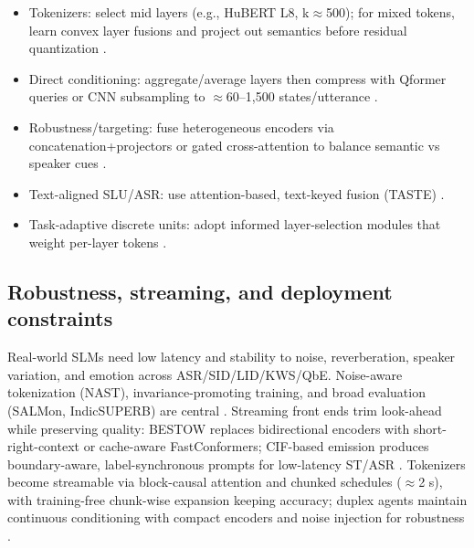 \documentclass{article}
\begin{document}
\begin{itemize}
  \item Tokenizers: select mid layers (e.g., HuBERT L8, k$\approx$500); for mixed tokens, learn convex layer fusions and project out semantics before residual quantization \cite{hussein2025hasrdhierarchicalacousticsemanticreprese,chen2023reducingbarriersselfsupervisedlearninghu}.
  \item Direct conditioning: aggregate/average layers then compress with Qformer queries or CNN subsampling to $\approx$60--1{,}500 states/utterance \cite{lu2024destaenhancingspeechlanguagemodelsthroug}.
  \item Robustness/targeting: fuse heterogeneous encoders via concatenation+projectors or gated cross-attention to balance semantic vs speaker cues \cite{mei2025shnumultilingualconversationalspeechreco,lin2025dkusystemmultispeakerautomaticspeechreco}.
  \item Text-aligned SLU/ASR: use attention-based, text-keyed fusion (TASTE) \cite{tseng2025tastetextalignedspeechtokenizationembedd}.
  \item Task-adaptive discrete units: adopt informed layer-selection modules that weight per-layer tokens \cite{mousavi2024howshouldweextractdiscreteaudiotokenssel}.
\end{itemize}

\subsection{Robustness, streaming, and deployment constraints} \label{subsec:robustness,streaming,anddeploymentconstraints}
Real-world SLMs need low latency and stability to noise, reverberation, speaker variation, and emotion across ASR/SID/LID/KWS/QbE. Noise-aware tokenization (NAST), invariance-promoting training, and broad evaluation (SALMon, IndicSUPERB) are central \cite{messica2024nastnoiseawarespeechtokenizationlanguage,maimon2025salmonsuiteacousticlanguagemodelevaluati,entry2025indicsuperbspeechprocessinguniversalperf}. Streaming front ends trim look-ahead while preserving quality: BESTOW replaces bidirectional encoders with short-right-context or cache-aware FastConformers; CIF-based emission produces boundary-aware, label-synchronous prompts for low-latency ST/ASR \cite{chen2024bestowefficientstreamablespeechlanguagem,deng2025simuls2sllmunlockingsimultaneousinferenc}. Tokenizers become streamable via block-causal attention and chunked schedules ($\approx$2 s), with training-free chunk-wise expansion keeping accuracy; duplex agents maintain continuous conditioning with compact encoders and noise injection for robustness \cite{zeng2024scalingspeechtextpretrainingsyntheticint,chang2024dcspinspeakerinvariantspeechtokenizerspo,ma2024languagemodelcanlistenwhilespeaking}.
\end{document}

